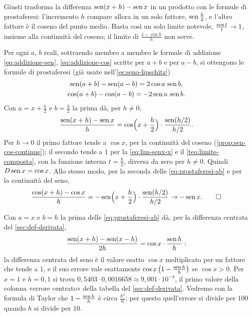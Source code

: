 \begin{strategia}
Giusti \cite{giusti} trasforma la differenza $\operatorname{sen}(x+h)-\operatorname{sen} x$ in un prodotto con le
formule di prostaferesi: l'incremento $h$ compare allora in un solo fattore,
$\operatorname{sen}\frac h2$, e l'altro fattore è il coseno del punto medio. Basta così un solo limite
notevole, $\frac{\operatorname{sen} t}t\to1$, insieme alla continuità del coseno; il limite di
$\frac{1-\cos h}h$ non serve.
\end{strategia}

\begin{dimostrazione}
Per ogni $a$, $b$ reali, sottraendo membro a membro le formule di addizione
\eqref{eq:addizione-sen}, \eqref{eq:addizione-cos} scritte per $a+b$ e per $a-b$, si
ottengono le formule di prostaferesi (già usate nell'\cref{es:seno-lipschitz})
\begin{equation}\label{eq:prostaferesi-ab}
\begin{gathered}
  \operatorname{sen}(a+b)-\operatorname{sen}(a-b)=2\cos a\,\operatorname{sen} b,\\
  \cos(a+b)-\cos(a-b)=-2\operatorname{sen} a\,\operatorname{sen} b .
\end{gathered}
\end{equation}
Con $a=x+\frac h2$ e $b=\frac h2$ la prima dà, per $h\neq0$,
\[
  \frac{\operatorname{sen}(x+h)-\operatorname{sen} x}{h}=\cos\Bigl(x+\frac h2\Bigr)\cdot\frac{\operatorname{sen}(h/2)}{h/2}.
\]
Per $h\to0$ il primo fattore tende a $\cos x$, per la continuità del coseno
(\cref{prop:sen-cos-continue}); il secondo tende a $1$ per la \eqref{eq:lim-senx-x} e il
\cref{teo:limite-composta}, con la funzione interna $t=\frac h2$, diversa da zero per
$h\neq0$. Quindi $D\operatorname{sen} x=\cos x$. Allo stesso modo, per la seconda delle
\eqref{eq:prostaferesi-ab} e per la continuità del seno,
\[
  \frac{\cos(x+h)-\cos x}{h}=-\operatorname{sen}\Bigl(x+\frac h2\Bigr)\cdot\frac{\operatorname{sen}(h/2)}{h/2}
  \to-\operatorname{sen} x . \qedhere
\]
\end{dimostrazione}

\begin{osservazione}\label{oss:seno-centrata}
Con $a=x$ e $b=h$ la prima delle \eqref{eq:prostaferesi-ab} dà, per la differenza
centrata del \cref{sec:def-derivata},
\[
  \frac{\operatorname{sen}(x+h)-\operatorname{sen}(x-h)}{2h}=\cos x\cdot\frac{\operatorname{sen} h}{h}:
\]
la differenza centrata del seno è il valore esatto $\cos x$ moltiplicato per un fattore
che tende a $1$, e il suo errore vale esattamente $\cos x\,\bigl(1-\frac{\operatorname{sen} h}h\bigr)$
se $\cos x>0$. Per $x=1$ e $h=0{,}1$ si trova $0{,}5403\cdot0{,}0016658\approx9{,}001\cdot
10^{-4}$, il primo valore della colonna «errore centrato» della tabella del
\cref{sec:def-derivata}. Vedremo con la formula di Taylor che $1-\frac{\operatorname{sen} h}h$ è circa
$\frac{h^{2}}6$: per questo quell'errore si divide per $100$ quando $h$ si divide per $10$.
\end{osservazione}

